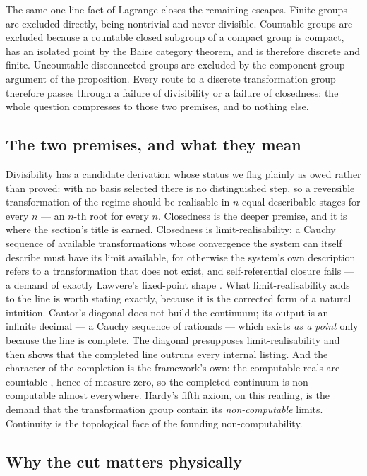 The same one-line fact of Lagrange closes the remaining escapes. Finite groups are excluded
directly, being nontrivial and never divisible. Countable groups are excluded because a countable
closed subgroup of a compact group is compact, has an isolated point by the Baire category theorem,
and is therefore discrete and finite. Uncountable disconnected groups are excluded by the
component-group argument of the proposition. Every route to a discrete transformation group
therefore passes through a failure of divisibility or a failure of closedness: the whole question
compresses to those two premises, and to nothing else.

\subsection{The two premises, and what they mean}

Divisibility has a candidate derivation whose status we flag plainly as owed rather than proved:
with no basis selected there is no distinguished step, so a reversible transformation of the regime
should be realisable in $n$ equal describable stages for every $n$ --- an $n$-th root for every $n$.
Closedness is the deeper premise, and it is where the section's title is earned. Closedness is
limit-realisability: a Cauchy sequence of available transformations whose convergence the system can
itself describe must have its limit available, for otherwise the system's own description refers to
a transformation that does not exist, and self-referential closure fails --- a demand of exactly
Lawvere's fixed-point shape \autocite{Lawvere_1969}. What limit-realisability adds to the line is
worth stating exactly, because it is the corrected form of a natural intuition. Cantor's diagonal
\autocite{cantor1891diagonal} does not build the continuum; its output is an infinite decimal --- a
Cauchy sequence of rationals --- which exists \emph{as a point} only because the line is complete.
The diagonal presupposes limit-realisability and then shows that the completed line outruns every
internal listing. And the character of the completion is the framework's own: the computable reals
are countable \autocite{Turing_1937}, hence of measure zero, so the completed continuum is
non-computable almost everywhere. Hardy's fifth axiom, on this reading, is the demand that the
transformation group contain its \emph{non-computable} limits. Continuity is the topological face of
the founding non-computability.

\subsection{Why the cut matters physically}

